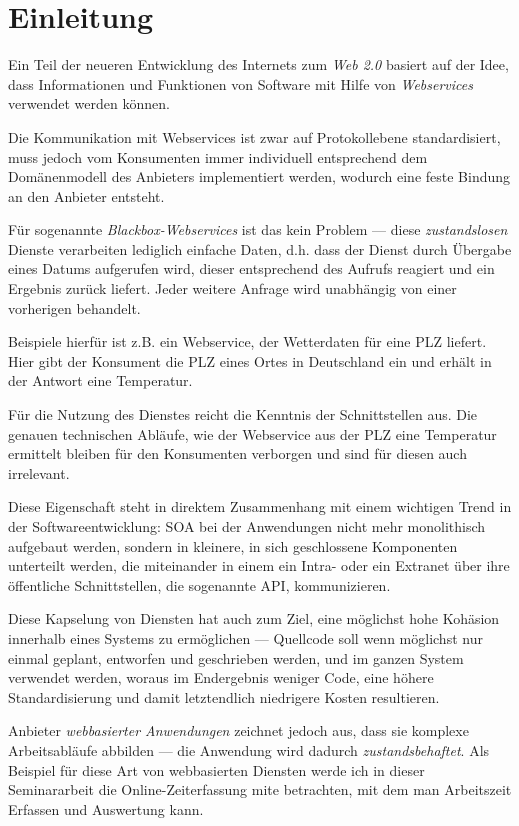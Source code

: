 \section{Einleitung}
\label{l:einleitung}

Ein Teil der neueren Entwicklung des Internets zum \emph{Web 2.0} basiert auf der Idee, dass Informationen und Funktionen von Software mit Hilfe von \emph{Webservices} verwendet werden können.

Die Kommunikation mit Webservices ist zwar auf Protokollebene standardisiert, muss jedoch vom Konsumenten immer individuell entsprechend dem Domänenmodell des Anbieters implementiert werden, wodurch eine feste Bindung an den Anbieter entsteht. \cite{ka-cots}

Für sogenannte \emph{Blackbox-Webservices} ist das kein Problem --- diese \emph{zustandslosen} Dienste verarbeiten lediglich einfache Daten, d.h. dass der Dienst durch Übergabe eines Datums aufgerufen wird, dieser entsprechend des Aufrufs reagiert und ein Ergebnis zurück liefert. Jeder weitere Anfrage wird unabhängig von einer vorherigen behandelt.

Beispiele hierfür ist z.B. ein Webservice, der Wetterdaten für eine PLZ liefert. Hier gibt der Konsument die PLZ eines Ortes in Deutschland ein und erhält in der Antwort eine Temperatur. 

Für die Nutzung des Dienstes reicht die Kenntnis der Schnittstellen aus. Die genauen technischen Abläufe, wie der Webservice aus der PLZ eine Temperatur ermittelt bleiben für den Konsumenten verborgen und sind für diesen auch irrelevant.\cite{hhxmlwssoa}

Diese Eigenschaft steht in direktem Zusammenhang mit einem wichtigen Trend in der Softwareentwicklung: \ac{SOA} bei der Anwendungen nicht mehr monolithisch aufgebaut werden, sondern in kleinere, in sich geschlossene Komponenten unterteilt werden, die miteinander in einem ein Intra- oder ein Extranet über ihre öffentliche Schnittstellen, die sogenannte \ac{API}, kommunizieren.

Diese Kapselung von Diensten hat auch zum Ziel, eine möglichst hohe Kohäsion innerhalb eines Systems zu ermöglichen --- Quellcode soll wenn möglichst nur einmal geplant, entworfen und geschrieben werden, und im ganzen System verwendet werden, woraus im Endergebnis weniger Code, eine höhere Standardisierung und damit letztendlich niedrigere Kosten resultieren. \cite{hn-web20}

Anbieter \emph{webbasierter Anwendungen} zeichnet jedoch aus, dass sie komplexe Arbeitsabläufe abbilden --- die Anwendung wird dadurch \emph{zustandsbehaftet}. Als Beispiel für diese Art von webbasierten Diensten werde ich in dieser Seminararbeit die Online-Zeiterfassung \ac{mite} betrachten, mit dem man Arbeitszeit Erfassen und Auswertung kann.

